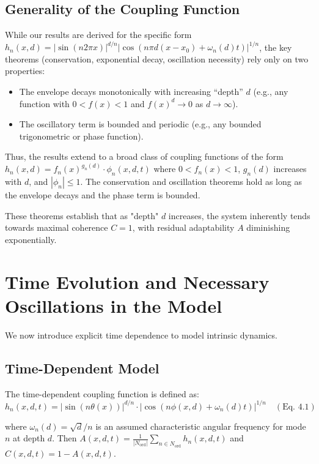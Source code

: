 \documentclass[11pt,a4paper]{article}
\begin{document}
\subsection{Generality of the Coupling Function}
While our results are derived for the specific form
$ h_n(x,d) = |\sin(n2\pi x)|^{d/n} |\cos(n\pi d(x-x_0) + \omega_n(d)t)|^{1/n} $,
the key theorems (conservation, exponential decay, oscillation necessity) rely only on two properties:
\begin{itemize}
    \item The envelope decays monotonically with increasing ``depth'' $ d $ (e.g., any function with $ 0 < f(x) < 1 $ and $ f(x)^d \to 0 $ as $ d \to \infty $).
    \item The oscillatory term is bounded and periodic (e.g., any bounded trigonometric or phase function).
\end{itemize}
Thus, the results extend to a broad class of coupling functions of the form
$ h_n(x,d) = f_n(x)^{g_n(d)} \cdot \phi_n(x,d,t) $
where $ 0 < f_n(x) < 1 $, $ g_n(d) $ increases with $ d $, and $ |\phi_n| \leq 1 $.
The conservation and oscillation theorems hold as long as the envelope decays and the phase term is bounded.

These theorems establish that as "depth" $d$ increases, the system inherently tends towards maximal coherence $C=1$, with residual adaptability $A$ diminishing exponentially.

\section{Time Evolution and Necessary Oscillations in the Model}

We now introduce explicit time dependence to model intrinsic dynamics.

\subsection{Time-Dependent Model}

The time-dependent coupling function is defined as:
\begin{equation}
    h_n(x,d,t) = |\sin(n\theta(x))|^{d/n} \cdot |\cos(n\phi(x,d) + \omega_n(d)t)|^{1/n} \quad (\text{Eq. 4.1})
\end{equation}

where $\omega_n(d) = \sqrt{d}/n$ is an assumed characteristic angular frequency for mode $n$ at depth $d$.
Then $A(x,d,t) = \frac{1}{|N_{\text{ord}}|} \sum_{n \in N_{\text{ord}}} h_n(x,d,t)$ and $C(x,d,t) = 1 - A(x,d,t)$.
\end{document}
